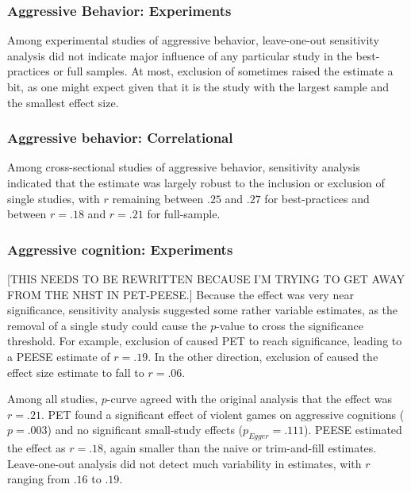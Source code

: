 \documentclass[man]{apa6}
\begin{document}
\subsubsection{Aggressive Behavior: Experiments}Among experimental studies of aggressive behavior, leave-one-out sensitivity analysis did not indicate major influence of any particular study in the best-practices or full samples. At most, exclusion of \citet{Anderson:etal:2007} sometimes raised the estimate a bit, as one might expect given that it is the study with the largest sample and the smallest effect size.

\subsubsection{Aggressive behavior: Correlational} Among cross-sectional studies of aggressive behavior, sensitivity analysis indicated that the estimate was largely robust to the inclusion or exclusion of single studies, with $r$ remaining between $.25$ and $.27$ for best-practices and between $r = .18$ and $r = .21$ for full-sample.

\subsubsection{Aggressive cognition: Experiments}[THIS NEEDS TO BE REWRITTEN BECAUSE I'M TRYING TO GET AWAY FROM THE NHST IN PET-PEESE.] Because the effect was very near significance, sensitivity analysis suggested some rather variable estimates, as the removal of a single study could cause the $p$-value to cross the significance threshold. For example, exclusion of \citet{Bushman:Anderson:2009} caused PET to reach significance, leading to a PEESE estimate of $r = .19$. In the other direction, exclusion of \citet{Anderson:Dill:2000} caused the effect size estimate to fall to $r = .06$.

Among all studies, $p$-curve agreed with the original analysis that the effect was $r = .21$. PET found a significant effect of violent games on aggressive cognitions ($p = .003$) and no significant small-study effects ($p_{Egger} = .111$). PEESE estimated the effect as $r = .18$, again smaller than the naive or trim-and-fill estimates. Leave-one-out analysis did not detect much variability in estimates, with $r$ ranging from $.16$ to $.19$. 
\end{document}
